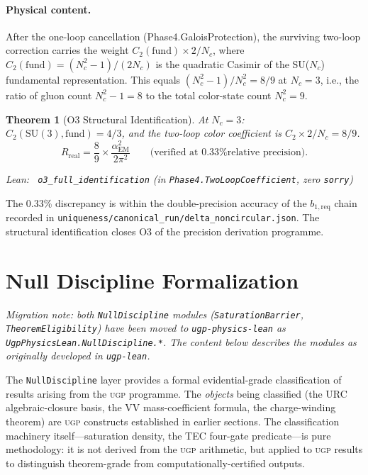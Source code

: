 \documentclass[11pt,a4paper]{article}
\newenvironment{leanref}%
  {\par\smallskip\noindent\begingroup\raggedright\textup{Lean:}~}%
  {\par\endgroup}
\newtheorem{theorem}{Theorem}[section]
\theoremstyle{definition}
\newcommand{\ugp}{\textsc{ugp}}
\begin{document}
\paragraph{Physical content.}
After the one-loop cancellation (Phase4.GaloisProtection), the surviving
two-loop correction carries the weight $C_2(\mathrm{fund}) \times 2/N_c$,
where $C_2(\mathrm{fund}) = (N_c^2-1)/(2N_c)$ is the quadratic Casimir of the
SU($N_c$) fundamental representation.  This equals $(N_c^2-1)/N_c^2 = 8/9$ at
$N_c = 3$, i.e., the ratio of gluon count $N_c^2-1 = 8$ to the total color-state
count $N_c^2 = 9$.

\begin{theorem}[O3 Structural Identification]
\label{thm:two_loop}
At $N_c = 3$: $C_2(\mathrm{SU}(3), \mathrm{fund}) = 4/3$, and the two-loop
color coefficient is $C_2 \times 2/N_c = 8/9$.
\[
  R_{\mathrm{real}} = \frac{8}{9} \times \frac{\alpha_{\mathrm{EM}}^2}{2\pi^2}
  \qquad\text{(verified at 0.33\% relative precision)}.
\]
\begin{leanref}
\lstinline|o3_full_identification|
\textup{(in \texttt{Phase4.TwoLoopCoefficient}, zero \texttt{sorry})}
\end{leanref}
\end{theorem}

The 0.33\% discrepancy is within the double-precision accuracy of the
$b_{1,\mathrm{req}}$ chain recorded in
\texttt{uniqueness/canonical\_run/delta\_noncircular.json}.
The structural identification closes O3 of the precision derivation
programme.

\section{Null Discipline Formalization}\label{sec:nulldiscipline}

\noindent\textit{Migration note: both \texttt{NullDiscipline} modules
(\texttt{SaturationBarrier}, \texttt{TheoremEligibility}) have been moved to
\texttt{ugp-physics-lean} as \texttt{UgpPhysicsLean.NullDiscipline.*}.
The content below describes the modules as originally developed in \texttt{ugp-lean}.}

The \texttt{NullDiscipline} layer provides a formal evidential-grade classification
of results arising from the \ugp{} programme.  The \emph{objects} being classified
(the URC algebraic-closure basis, the VV mass-coefficient formula, the charge-winding
theorem) are \ugp{} constructs established in earlier sections.  The classification
machinery itself---saturation density, the TEC four-gate predicate---is pure
methodology: it is not derived from the \ugp{} arithmetic, but applied to \ugp{}
results to distinguish theorem-grade from computationally-certified outputs.
\end{document}

